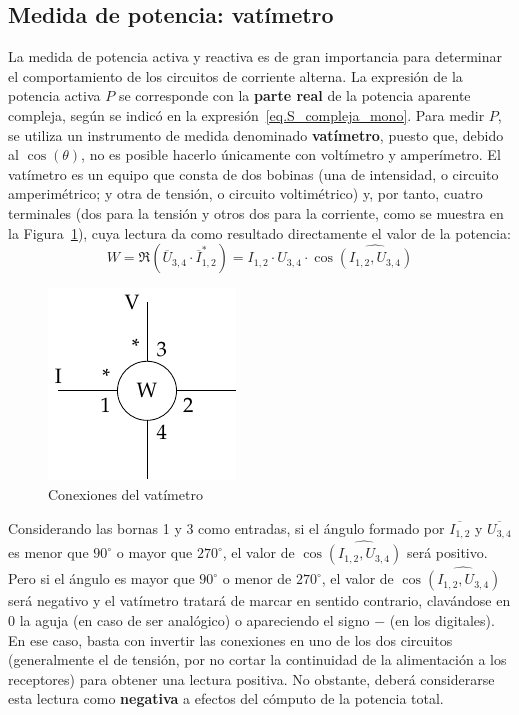 	\subsection{Medida de potencia: vatímetro}\label{sec.medida_potencia}
	
	La medida de potencia activa y reactiva es de gran importancia para determinar el comportamiento de los circuitos de corriente alterna. La expresión de la potencia activa $P$ se corresponde con la \textbf{parte real} de la potencia aparente compleja, según se indicó en la expresión~\eqref{eq.S_compleja_mono}. Para medir $P$, se utiliza un instrumento de medida denominado \textbf{vatímetro}, puesto que, debido al $\cos(\theta)$, no es posible hacerlo únicamente con voltímetro y amperímetro. El vatímetro es un equipo que consta de dos bobinas (una de intensidad, o circuito amperimétrico; y otra de tensión, o circuito voltimétrico) y, por tanto, cuatro terminales (dos para la tensión y otros dos para la corriente, como se muestra en la Figura~\ref{fig.vatimetro_2}), cuya lectura da como resultado directamente el valor de la potencia:
	\begin{equation*}
	    W=\Re(\overline{U}_{3,4} \cdot \overline{I}_{1,2}^*)=I_{1,2}\cdot U_{3,4}\cdot \cos\widehat{(I_{1,2}, U_{3,4})}
	\end{equation*}%
	
	\begin{figure}[H]
	    \centering
	    \includegraphics{../figs/vatimetro_2.pdf}
	    \caption{Conexiones del vatímetro}
	    \label{fig.vatimetro_2}
	\end{figure}
	Considerando las bornas 1 y 3 como entradas, si el ángulo formado por $\overline{I_{1,2}}$ y $\overline{U_{3,4}}$ es menor que $90^\circ$ o mayor que $270^\circ$, el valor de $\cos\widehat{(I_{1,2}, U_{3,4})}$ será positivo. Pero si el ángulo es mayor que $90^\circ$ o menor de $270^\circ$, el valor de  $\cos\widehat{(I_{1,2}, U_{3,4})}$ será negativo y el vatímetro tratará de marcar en sentido contrario, clavándose en $0$ la aguja (en caso de ser analógico) o apareciendo el signo $-$ (en los digitales). En ese caso, basta con invertir las conexiones en uno de los dos circuitos (generalmente el de tensión, por no cortar la continuidad de la alimentación a los receptores) para obtener una lectura positiva. No obstante, deberá considerarse esta lectura como \textbf{negativa} a efectos del cómputo de la potencia total. 
	
